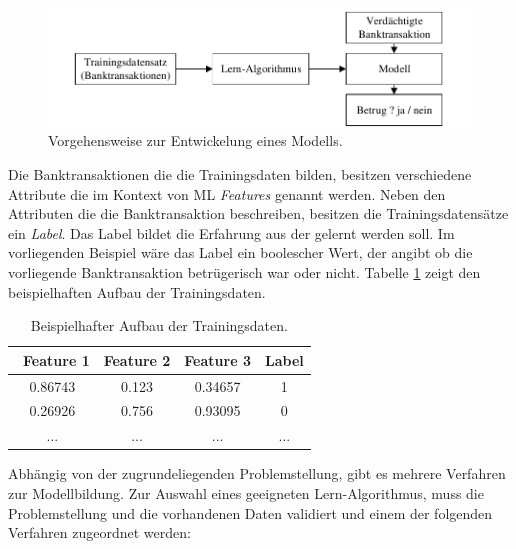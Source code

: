 \begin{figure}[ht]
\centering
\includegraphics{images/lernprozess.pdf}
\caption{Vorgehensweise zur Entwickelung eines Modells.}
\label{fig:lernprozess}
\end{figure}  

Die Banktransaktionen die die Trainingsdaten bilden, besitzen verschiedene Attribute die im Kontext von ML \emph{Features} genannt werden. Neben den Attributen die die Banktransaktion beschreiben, besitzen die Trainingsdatensätze ein \emph{Label}. Das Label bildet die Erfahrung aus der gelernt werden soll. Im vorliegenden Beispiel wäre das Label ein boolescher Wert, der angibt ob die vorliegende Banktransaktion betrügerisch war oder nicht. Tabelle \ref{tab:trainingset} zeigt den beispielhaften Aufbau der Trainingsdaten.

\begin{table}[ht]
\centering
\small
\begin{tabular}{cccc}
\toprule
\ Feature 1 & Feature 2 & Feature 3 & Label\\
\toprule
0.86743 & 0.123 & 0.34657 & 1\\\midrule
0.26926 & 0.756 & 0.93095 & 0\\\midrule
... & ... & ... & ...\\\bottomrule
\end{tabular}
\caption{Beispielhafter Aufbau der Trainingsdaten.}
\label{tab:trainingset}
\end{table}

Abhängig von der zugrundeliegenden Problemstellung, gibt es mehrere Verfahren zur Modellbildung. Zur Auswahl eines geeigneten Lern-Algorithmus, muss die Problemstellung und die vorhandenen Daten validiert und einem der folgenden Verfahren zugeordnet werden:  

